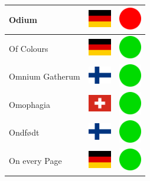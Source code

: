 \documentclass[12pt, a4paper, twoside]{report}
\begin{document}
\begin{center}
\begin{longtable}{|p{5cm}|p{2cm}|p{2cm}|}
 Odium                                                      & \includegraphics[width=1cm]{../img/flags/de} &   \includegraphics[width=1cm]{../likes/n} \\ \hline
 Of Colours                                                 & \includegraphics[width=1cm]{../img/flags/de} &   \includegraphics[width=1cm]{../likes/y} \\ \hline
 Omnium Gatherum                                            & \includegraphics[width=1cm]{../img/flags/fi} &   \includegraphics[width=1cm]{../likes/y} \\ \hline
 Omophagia                                                  & \includegraphics[width=1cm]{../img/flags/ch} &   \includegraphics[width=1cm]{../likes/y} \\ \hline
 Ondfødt                                                    & \includegraphics[width=1cm]{../img/flags/fi} &   \includegraphics[width=1cm]{../likes/y} \\ \hline
 On every Page                                              & \includegraphics[width=1cm]{../img/flags/de} &   \includegraphics[width=1cm]{../likes/y} \\ \hline

\end{longtable}
\end{center}
\end{document}
